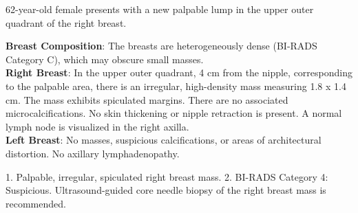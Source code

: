 \begin{testbox}[Indications:]
62-year-old female presents with a new palpable lump in the upper outer quadrant of the right breast.
\end{testbox}
\begin{refbox}[Findings:]
\textbf{Breast Composition}: The breasts are heterogeneously dense (BI-RADS Category C), which may obscure small masses.\\
\textbf{Right Breast}: In the upper outer quadrant, 4 cm from the nipple, corresponding to the palpable area, there is an irregular, high-density mass measuring 1.8 x 1.4 cm. The mass exhibits spiculated margins. There are no associated microcalcifications. No skin thickening or nipple retraction is present. A normal lymph node is visualized in the right axilla.\\
\textbf{Left Breast}: No masses, suspicious calcifications, or areas of architectural distortion. No axillary lymphadenopathy.
\end{refbox}
\begin{pearlbox}[Impression:]
1. Palpable, irregular, spiculated right breast mass.
2. BI-RADS Category 4: Suspicious. Ultrasound-guided core needle biopsy of the right breast mass is recommended.
\end{pearlbox}

\clearpage
